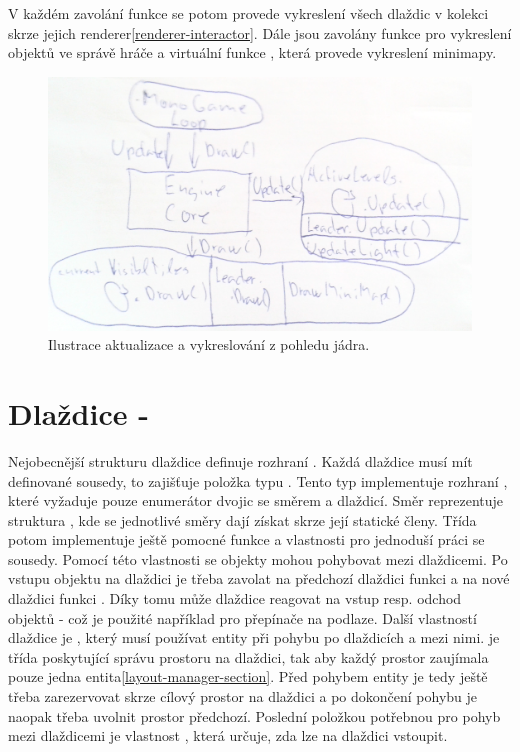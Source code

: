 V každém zavolání funkce  se potom provede vykreslení všech dlaždic v kolekci 
skrze jejich renderer\vref{renderer-interactor}. Dále jsou zavolány funkce  pro vykreslení objektů
ve správě hráče a virtuální funkce , která provede vykreslení minimapy.

\begin{figure}[H]\centering
\includegraphics[width=\textwidth]{./img/core-update-draw.png}
\caption{Ilustrace aktualizace a vykreslování z pohledu jádra. }
\label{core-update-draw}
\end{figure}


\section{Dlaždice - }
Nejobecnější strukturu dlaždice definuje rozhraní . Každá dlaždice musí mít definované sousedy,
to zajišťuje položka  typu . Tento typ implementuje rozhraní ,
které vyžaduje pouze enumerátor dvojic se směrem a dlaždicí. Směr reprezentuje struktura , kde
se jednotlivé směry dají získat skrze její statické členy. Třída  potom implementuje ještě
pomocné funkce a vlastnosti pro jednoduší práci se sousedy. Pomocí této vlastnosti se objekty mohou pohybovat
mezi dlaždicemi. Po vstupu objektu na dlaždici je třeba zavolat na předchozí dlaždici funkci  a
na nové dlaždici funkci . Díky tomu může dlaždice reagovat na vstup resp. odchod objektů -
což je použité například pro přepínače na podlaze. Další vlastností dlaždice je , který 
musí používat entity při pohybu po dlaždicích a mezi nimi.  je třída poskytující správu prostoru
na dlaždici, tak aby každý prostor zaujímala pouze jedna entita\vref{layout-manager-section}. Před pohybem entity je
tedy ještě třeba zarezervovat skrze  cílový prostor na dlaždici a po dokončení pohybu
je naopak třeba uvolnit prostor předchozí. Poslední položkou potřebnou pro pohyb mezi dlaždicemi je vlastnost
, která určuje, zda lze na dlaždici vstoupit.


